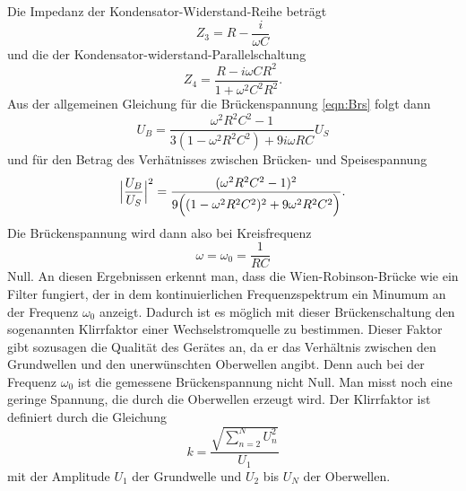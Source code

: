 Die Impedanz der Kondensator-Widerstand-Reihe beträgt
\begin{equation}
  Z_3 = R - \frac{i}{\omega C}
\end{equation}
und die der Kondensator-widerstand-Parallelschaltung
\begin{equation}
  Z_4 = \frac{R - i\omega C R^2}{1 + \omega^2 C^2 R^2} .
\end{equation}
Aus der allgemeinen Gleichung für die Brückenspannung \eqref{eqn:Brs}
folgt dann
\begin{equation}
  U_B = \frac{\omega^2 R^2 C^2 -1}{3(1 - \omega^2 R^2 C^2) + 9 i \omega R C}U_S
\end{equation}
und für den Betrag des Verhätnisses zwischen Brücken- und Speisespannung
\begin{equation}
  \Bigl|\frac{U_B}{U_S}\Bigr|^2 = \frac{(\omega^2 R^2 C^2 -1)^2}{9\Bigl
  ((1-\omega^2 R^2 C^2)^2 + 9 \omega^2 R^2 C^2\Bigr)} .
\end{equation}
Die Brückenspannung wird dann also bei Kreisfrequenz
\begin{equation}
  \omega = \omega_0 = \frac{1}{RC}
\end{equation}
Null.
An diesen Ergebnissen erkennt man, dass die Wien-Robinson-Brücke wie ein
Filter fungiert, der in dem kontinuierlichen Frequenzspektrum ein Minumum
an der Frequenz $\omega_0$ anzeigt. Dadurch ist es möglich mit dieser
Brückenschaltung den sogenannten Klirrfaktor einer Wechselstromquelle zu
bestimmen. Dieser Faktor gibt sozusagen die Qualität des Gerätes an, da er das
Verhältnis zwischen den Grundwellen und den unerwünschten Oberwellen angibt.
Denn auch bei der Frequenz $\omega_0$ ist die gemessene Brückenspannung nicht
Null. Man misst noch eine geringe Spannung, die durch die Oberwellen erzeugt
wird. Der Klirrfaktor ist definiert durch die Gleichung
\begin{equation}
  k = \frac{\sqrt{\sum_{n=2}^N U_n^2}}{U_1}
\end{equation}
mit der Amplitude $U_1$ der Grundwelle und $U_2$ bis $U_N$ der Oberwellen.
